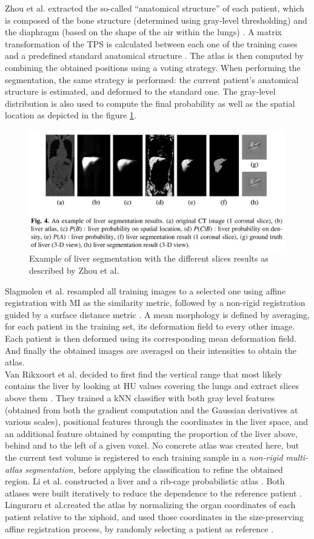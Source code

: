 \documentclass[]{article}
\begin{document}
Zhou et al. extracted the so-called ``anatomical structure'' of each
patient, which is composed of the bone structure (determined using
gray-level thresholding) and the diaphragm (based on the shape of the
air within the lungs) \cite{Zhou2006}. A matrix transformation of the TPS is calculated
between each one of the training cases and a predefined standard
anatomical structure \cite{Zhou2005}.
The atlas is then computed by combining the obtained positions using a
voting strategy. When performing the segmentation, the same strategy is
performed: the current patient's anatomical structure is estimated, and
deformed to the standard one. The gray-level distribution is also used
to compute the final probability as well as the spatial location as
depicted in the figure \ref{Zhou2006_Fig4}.
\begin{figure}[th!]
	\centering
	\includegraphics[width=0.7\linewidth]{images/image31}
	\caption{Example of liver segmentation with the different slices results as described by Zhou et al. \cite{Zhou2006}}
	\label{Zhou2006_Fig4}
\end{figure}

Slagmolen et al. resampled all training images to a selected one using
affine registration with MI as the similarity metric, followed by a
non-rigid registration guided by a surface distance metric \cite{Slagmolen2007}. A mean
morphology is defined by averaging, for each patient in the training
set, its deformation field to every other image. Each patient is then
deformed using its corresponding mean deformation field. And finally the
obtained images are averaged on their intensities to obtain the atlas.\\
Van Rikxoort et al. decided to first find the vertical range that most likely
contains the liver by looking at HU values covering the lungs and
extract slices above them \cite{Rikxoort2007}. They trained a kNN classifier with both gray
level features (obtained from both the gradient computation and the
Gaussian derivatives at various scales), positional features through the
coordinates in the liver space, and an additional feature obtained by
computing the proportion of the liver above, behind and to the left of a
given voxel. No concrete atlas was created here, but the current test
volume is registered to each training sample in a \emph{non-rigid
	multi-atlas segmentation}, before applying the classification to refine
the obtained region.
Li et al. constructed a liver and a rib-cage probabilistic atlas . Both
atlases were built iteratively to reduce the dependence to the reference
patient \cite{Li2010}. 
Linguraru et al.created the atlas by normalizing the organ coordinates of
each patient relative to the xiphoid, and used those coordinates in the
size-preserving affine registration process, by randomly selecting a
patient as reference \cite{Linguraru2009}.
\end{document}
